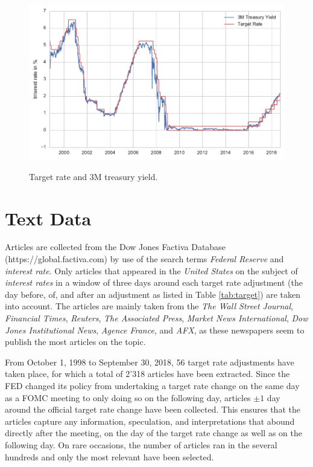 \documentclass[11pt,a4paper,english,oneside]{book}
\numberwithin{equation}{chapter}
\begin{document}
\begin{figure}
	\caption{Target rate and 3M treasury yield.}
	\centering
	\includegraphics[scale=1]{Images/3Mtreasury.pdf}
	\label{3Mtreasury}
\end{figure}

\section{Text Data}\label{textdata}

Articles are collected from the Dow Jones Factiva Database (https://global.factiva.com) by use of the search terms \textit{Federal Reserve} and \textit{interest rate}. Only articles that appeared in the \textit{United States} on the subject of \textit{interest rates} in a window of three days around each target rate adjustment (the day before, of, and after an adjustment as listed in Table \ref{tab:target}) are taken into account. The articles are mainly taken from the \textit{The Wall Street Journal}, \textit{Financial Times}, \textit{Reuters}, \textit{The Associated Press}, \textit{Market News International}, \textit{Dow Jones Institutional News}, \textit{Agence France}, and \textit{AFX}, as these newspapers seem to publish the most articles on the topic. 

From October 1, 1998 to September 30, 2018, 56 target rate adjustments have taken place, for which a total of 2'318 articles have been extracted. Since the FED changed its policy from undertaking a target rate change on the same day as a FOMC meeting to only doing so on the following day, articles $\pm1$ day around the official target rate change have been collected. This ensures that the articles capture any information, speculation, and interpretations that abound directly after the meeting, on the day of the target rate change as well as on the following day. On rare occasions, the number of articles ran in the several hundreds and only the most relevant have been selected. 
\end{document}
